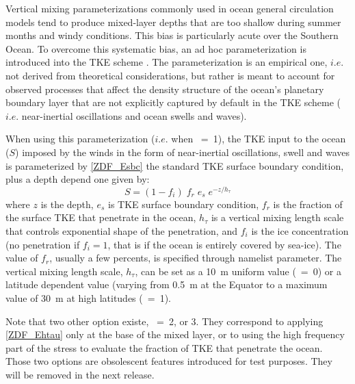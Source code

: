 \documentclass[NEMO_book]{subfiles}
\begin{document}
Vertical mixing parameterizations commonly used in ocean general circulation models 
tend to produce mixed-layer depths that are too shallow during summer months and windy conditions.
This bias is particularly acute over the Southern Ocean. 
To overcome this systematic bias, an ad hoc parameterization is introduced into the TKE scheme  \cite{Rodgers_2014}. 
The parameterization is an empirical one, $i.e.$ not derived from theoretical considerations, 
but rather is meant to account for observed processes that affect the density structure of 
the ocean’s planetary boundary layer that are not explicitly captured by default in the TKE scheme 
($i.e.$ near-inertial oscillations and ocean swells and waves).

When using this parameterization ($i.e.$ when ~=~1), the TKE input to the ocean ($S$) 
imposed by the winds in the form of near-inertial oscillations, swell and waves is parameterized 
by \eqref{ZDF_Esbc} the standard TKE surface boundary condition, plus a depth depend one given by:
\begin{equation}  \label{ZDF_Ehtau}
S = (1-f_i) \; f_r \; e_s \; e^{-z / h_\tau} 
\end{equation}
where 
$z$ is the depth,  
$e_s$ is TKE surface boundary condition, 
$f_r$ is the fraction of the surface TKE that penetrate in the ocean, 
$h_\tau$ is a vertical mixing length scale that controls exponential shape of the penetration, 
and $f_i$ is the ice concentration (no penetration if $f_i=1$, that is if the ocean is entirely 
covered by sea-ice).
The value of $f_r$, usually a few percents, is specified through  namelist parameter. 
The vertical mixing length scale, $h_\tau$, can be set as a 10~m uniform value (~=~0) 
or a latitude dependent value (varying from 0.5~m at the Equator to a maximum value of 30~m 
at high latitudes (~=~1). 

Note that two other option existe, ~=~2, or 3. They correspond to applying 
\eqref{ZDF_Ehtau} only at the base of the mixed layer, or to using the high frequency part 
of the stress to evaluate the fraction of TKE that penetrate the ocean. 
Those two options are obsolescent features introduced for test purposes.
They will be removed in the next release. 



\end{document}
